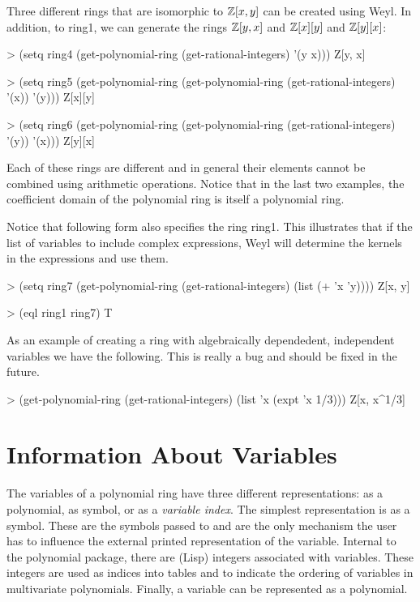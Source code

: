 Three different rings that are isomorphic to ${\Bbb Z}[x, y]$ can be created
using Weyl.  In addition, to {\sf ring1}, we can generate the rings
${\Bbb Z}[y, x]$ and ${\Bbb Z}[x][y]$ and ${\Bbb Z}[y][x]$:
\begin{code}
> (setq ring4 (get-polynomial-ring (get-rational-integers) '(y x)))
Z[y, x]

> (setq ring5 (get-polynomial-ring 
                 (get-polynomial-ring (get-rational-integers) '(x))
                 '(y)))
Z[x][y]

> (setq ring6 (get-polynomial-ring 
                 (get-polynomial-ring (get-rational-integers) '(y))
                 '(x)))
Z[y][x]
\end{code}
Each of these rings are different and in general their elements cannot
be combined using arithmetic operations.  Notice that in the last two
examples, the coefficient domain of the polynomial ring is itself a
polynomial ring. 

Notice that following form also specifies the ring {\sf ring1}.  This
illustrates that if the list of variables to
 include complex expressions, Weyl will
determine the kernels in the expressions and use them.
\begin{code}
> (setq ring7 (get-polynomial-ring (get-rational-integers) (list (+ 'x 'y))))
Z[x, y]

> (eql ring1 ring7)
T
\end{code}

As an example of creating a ring with algebraically dependedent,
independent variables we have the following.  This is really a bug and
should be fixed in the future. 
\begin{code}
> (get-polynomial-ring (get-rational-integers) (list 'x (expt 'x 1/3)))
Z[x, x^1/3]
\end{code}

\section{Information About Variables}

The variables of a polynomial ring have three different
representations: as a polynomial, as symbol, or as a {\sl variable
index\/}.  The simplest representation is as a symbol.  These are the
symbols passed to  and are the only mechanism the
user has to influence the external printed representation of the
variable.  Internal to the polynomial package, there are (Lisp) integers
associated with variables.  These integers are used as indices into
tables and to indicate the ordering of variables in multivariate
polynomials.  Finally, a variable can be represented as a polynomial.

